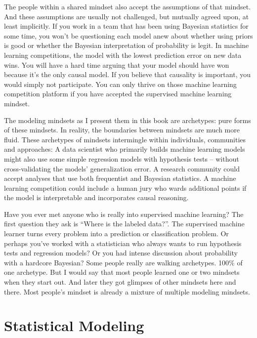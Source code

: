 \documentclass[
  10pt,
]{scrbook}
\begin{document}
The people within a shared mindset also accept the assumptions of that mindset.
And these assumptions are usually not challenged, but mutually agreed upon, at least implicitly.
If you work in a team that has been using Bayesian statistics for some time, you won't be questioning each model anew about whether using priors is good or whether the Bayesian interpretation of probability is legit.
In machine learning competitions, the model with the lowest prediction error on new data wins.
You will have a hard time arguing that your model should have won because it's the only causal model.
If you believe that causality is important, you would simply not participate.
You can only thrive on those machine learning competition platform if you have accepted the supervised machine learning mindset.

The modeling mindsets as I present them in this book are archetypes: pure forms of these mindsets.
In reality, the boundaries between mindsets are much more fluid.
These archetypes of mindsets intermingle within individuals, communities and approaches:
A data scientist who primarily builds machine learning models might also use some simple regression models with hypothesis tests -- without cross-validating the models' generalization error.
A research community could accept analyses that use both frequentist and Bayesian statistics.
A machine learning competition could include a human jury who wards additional points if the model is interpretable and incorporates causal reasoning.

Have you ever met anyone who is really into supervised machine learning?
The first question they ask is ``Where is the labeled data?''.
The supervised machine learner turns every problem into a prediction or classification problem.
Or perhaps you've worked with a statistician who always wants to run hypothesis tests and regression models?
Or you had intense discussion about probability with a hardcore Bayesian?
Some people really are walking archetypes. 100\% of one archetype.
But I would say that most people learned one or two mindsets when they start out.
And later they got glimpses of other mindsets here and there.
Most people's mindset is already a mixture of multiple modeling mindsets.

\hypertarget{statistical-modeling}{%
\chapter{Statistical Modeling}\label{statistical-modeling}}
\end{document}
